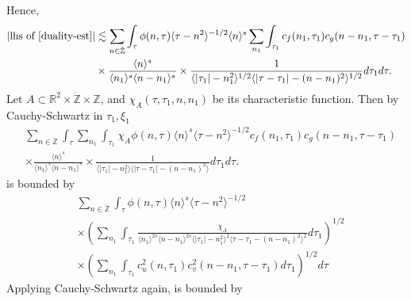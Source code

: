 \documentclass[12pt,reqno]{amsart}
\numberwithin{equation}{section}  %
\renewcommand{\cref}{\Cref}
\newcommand{\rr}{\mathbb{R}}
\newcommand{\zz}{\mathbb{Z}}
\newcommand{\zzdot}{\dot{\zz}}
\begin{document}
%
%
Hence, 
%
%
\begin{equation}
  \label{pre-fubini-int-form}
	\begin{split}
    |\text{lhs of} \ \cref{duality-est}|
    & \lesssim \sum_{n \in \zzdot} \int_{\tau} \phi(n, \tau)\langle \tau - n^{2} \rangle^{-1/2}  \langle n \rangle^s 
  \sum_{n_{1}}
  \int_{\tau_{1}} c_f(n_1, \tau_1)
		c_g(n - n_1, \tau - \tau_1 )
		\\
    & \times \frac{\langle n \rangle ^{s}}{\langle n_{1} \rangle ^{s} \langle
    n-n_{1} \rangle ^{s}} \times \frac{1}{\langle |\tau_{1}|-n_{1}^{2} \rangle^{1/2}\langle | \tau -
    \tau_{1}|-(n - n_{1})^{2}
    \rangle^{1/2}} d \tau_1 d \tau.
	\end{split}
\end{equation}
%
%
%
Let $A \subset \rr^{2} \times \zzdot \times \zz$, and $\chi_{A}(\tau, \tau_{1}, n, n_{1})$
be its
characteristic function. Then by Cauchy-Schwartz in
$\tau_{1}, \xi_{1}$
\begin{equation*}
	\begin{split}
    & \sum_{n \in \zzdot} \int_{\tau}   \sum_{n_{1}}
    \int_{\tau_{1}} \chi_{A}
    \phi(n, \tau) \langle n \rangle^s \langle \tau - n^{2} \rangle^{-1/2}
  c_f(n_1, \tau_1)
		c_g(n - n_1, \tau - \tau_1 )
		\\
    & \times \frac{\langle n \rangle ^{s}}{\langle n_{1} \rangle ^{s} \langle
    n-n_{1} \rangle ^{s}} \times \frac{1}{\langle |\tau_{1}|-n_{1}^{2} \rangle\langle | \tau -
    \tau_{1}|-(n - n_{1})^{2}
    \rangle} d \tau_1 d \tau.
	\end{split}
\end{equation*}
%
is bounded by 
%
%
\begin{equation}
	\label{10g}
	\begin{split}
    & \sum_{n \in \zzdot} \int_{\tau} \phi(n, \tau) \langle n \rangle ^{s}
    \langle \tau - n^{2} \rangle ^{-1/2}
    \\
    & \times \left( \sum_{n_{1}} \int_{\tau_{1}}
    \frac{\chi_{A}}{\langle n_{1} \rangle ^{2s} \langle n-n_{1} \rangle ^{2s} \langle |
    \tau_{1} | - n_{1}^{2}\rangle^{2}  \langle \tau - \tau_{1} -
    (n - n_{1})^{2} \rangle^{2}} d \tau_{1} \right)^{1/2}
    \\
    & \times \left( \sum_{n_{1}} \int_{\tau_{1}} c_{u}^{2}(n, \tau_{1})
    c_{v}^{2}(n - n_{1}, \tau - \tau_{1}) d \tau_{1} \right)^{1/2} d \tau
  \end{split}
\end{equation}
%
%
Applying Cauchy-Schwartz again, \cref{10g} is bounded by
\end{document}
